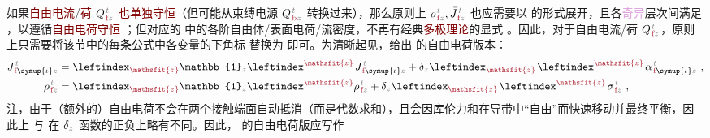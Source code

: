 如果\textcolor{Maroon}{自由电流}/\textcolor{Maroon}{荷} ${Q}^{\;\!\mathcolor{gray}{t}}_{\;\!\textcolor{Maroon}{\text{f}}\mathcolor{gray}{z}}$ \textcolor{Maroon}{也单独守恒}（但可能从束缚电源 ${Q}^{\;\!\mathcolor{gray}{t}}_{\;\!\textcolor{Maroon}{\text{b}}\mathcolor{gray}{z}}$ 转换过来），那么原则上 ${\rho}^{\;\!\mathcolor{gray}{t}}_{\;\!\textcolor{Maroon}{\text{f}}\mathcolor{gray}{z}},\bar{J}^{\;\!\mathcolor{gray}{t}}_{\;\!\textcolor{Maroon}{\text{f}}\mathcolor{gray}{z}}$ 也应需要以  的形式展开，且各\textcolor{Plum}{奇异}层次间满足 ，以遵循\textcolor{Maroon}{自由电荷守恒} ；但对应的  中的各阶自由体/表面电荷/流密度，不再有经典\textcolor{Maroon}{多极理论}的显式 。因此，对于自由电流/荷 ${Q}^{\;\!\mathcolor{gray}{t}}_{\;\!\textcolor{Maroon}{\text{f}}\mathcolor{gray}{z}}$，原则上只需要将该节中的每条公式中各变量的下角标 \textcolor{Maroon}{} 替换为 \textcolor{Maroon}{} 即可。为清晰起见，给出  的自由电荷版本：
\begin{subequations} \label{eq:e-f-01}
	\abovedisplayskip=5pt
\begin{align}
	J^{\;\!\mathcolor{gray}{t}}_{\;\!\textcolor{Maroon}{\text{f}} \symup{\iota}\mathcolor{gray}{z}} &= \leftindex_{\textcolor{Maroon}{\mathsfit{z}}} {\mathbb{1}}_{\mathcolor{gray}{z}} \leftindex^{\textcolor{Maroon}{\mathsfit{z}}} \;\! J^{\;\!\mathcolor{gray}{t}}_{\;\!\textcolor{Maroon}{\text{f}} \symup{\iota}\mathcolor{gray}{z}} + \delta_{\mathcolor{gray}{z}} \leftindex_{\textcolor{Maroon}{\mathsfit{z}}} \;\! \leftindex^{\textcolor{Maroon}{\mathsfit{z}}} \;\!
	{\alpha}^{\;\!\mathcolor{gray}{t}}_{\;\!\textcolor{Maroon}{\text{f}} \symup{\iota}\mathcolor{gray}{z}} ~, \label{eq:j-f-01} \\
	{\rho}^{\;\!\mathcolor{gray}{t}}_{\;\!\textcolor{Maroon}{\text{f}}\mathcolor{gray}{z}} &= \leftindex_{\textcolor{Maroon}{\mathsfit{z}}} {\mathbb{1}}_{\mathcolor{gray}{z}} \leftindex^{\textcolor{Maroon}{\mathsfit{z}}} {\rho}^{\;\!\mathcolor{gray}{t}}_{\;\!\textcolor{Maroon}{\text{f}}\mathcolor{gray}{z}} + \delta_{\mathcolor{gray}{z}} \leftindex_{\textcolor{Maroon}{\mathsfit{z}}} \;\! \leftindex^{\textcolor{Maroon}{\mathsfit{z}}} \;\! {\sigma}^{\;\!\mathcolor{gray}{t}}_{\;\!\textcolor{Maroon}{\text{f}} \mathcolor{gray}{z}} ~, \label{eq:p-f-01}
\end{align}
\end{subequations}
注，由于（额外的）自由电荷不会在两个接触端面自动抵消（而是代数求和），且会因库伦力和在导带中“自由”而快速移动并最终平衡，因此上  与  在 $\delta_{\mathcolor{gray}{z}}$ 函数的正负上略有不同。因此，  的自由电荷版应写作
